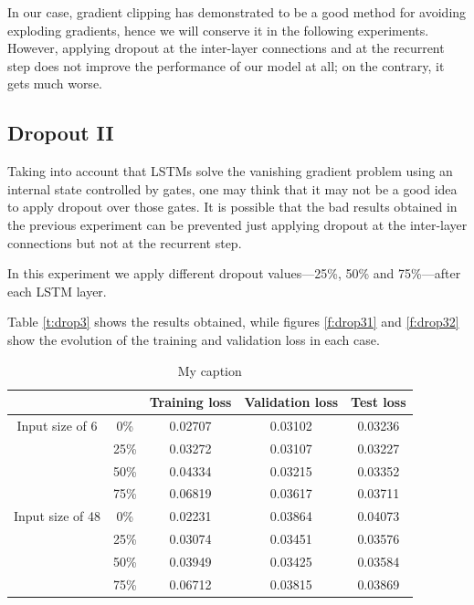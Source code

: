 \documentclass[]{article}
\begin{document}
In our case, gradient clipping has demonstrated to be a good method for avoiding exploding gradients, hence we will conserve it in the following experiments. However, applying dropout at the inter-layer connections and at the recurrent step does not improve the performance of our model at all; on the contrary, it gets much worse.

\subsection{Dropout II}

Taking into account that LSTMs solve the vanishing gradient problem using an internal state controlled by gates, one may think that it may not be a good idea to apply dropout over those gates. It is possible that the bad results obtained in the previous experiment can be prevented just applying dropout at the inter-layer connections but not at the recurrent step.

In this experiment we apply different dropout values---25\%, 50\% and 75\%---after each LSTM layer.

Table \ref{t:drop3} shows the results obtained, while figures \ref{f:drop31} and \ref{f:drop32} show the evolution of the training and validation loss in each case.

\begin{table}[H]
	\centering
	\begin{tabular}{@{}ccccc@{}}
		\toprule
		&      & Training loss & Validation loss & Test loss \\ \midrule
		Input size of 6  & 0\%  & 0.02707       & 0.03102         & 0.03236   \\
		& 25\% & 0.03272       & 0.03107         & 0.03227   \\
		& 50\% & 0.04334       & 0.03215         & 0.03352   \\
		& 75\% & 0.06819       & 0.03617         & 0.03711   \\
		Input size of 48 & 0\%  & 0.02231       & 0.03864         & 0.04073   \\
		& 25\% & 0.03074       & 0.03451         & 0.03576   \\
		& 50\% & 0.03949       & 0.03425         & 0.03584   \\
		& 75\% & 0.06712       & 0.03815         & 0.03869   \\ \bottomrule
	\end{tabular}
	\caption{My caption}
	\label{my-label}
\end{table}
\end{document}
